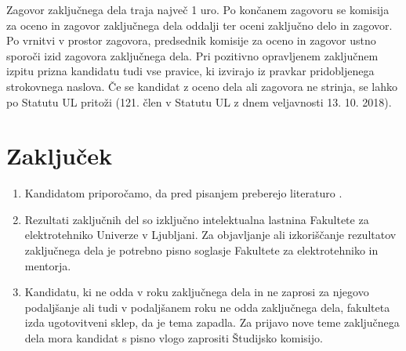 \documentclass[a4paper,twoside,openright,12pt,slovene]{book}
\begin{document}
Zagovor zaključnega dela traja največ 1 uro. Po končanem zagovoru se komisija za oceno in zagovor zaključnega dela oddalji ter oceni zaključno delo in zagovor. Po vrnitvi v prostor zagovora, predsednik komisije za oceno in zagovor ustno sporoči izid zagovora zaključnega dela. Pri pozitivno opravljenem zaključnem izpitu prizna kandidatu tudi vse pravice, ki izvirajo iz pravkar pridobljenega strokovnega naslova. Če se kandidat z oceno dela ali zagovora ne strinja, se lahko po Statutu UL pritoži (121. člen v Statutu UL z dnem veljavnosti 13. 10. 2018).

\chapter{Zaključek} \label{zakljucek}

\begin{enumerate}

\item Kandidatom priporočamo, da pred pisanjem preberejo literaturo \cite{miklavcic2010objavljanje, juznic1992diplomska, kuscer1996}.

\item Rezultati zaključnih del so izključno intelektualna lastnina Fakultete za elektrotehniko Univerze v Ljubljani. Za objavljanje ali izkoriščanje rezultatov zaključnega dela je potrebno pisno soglasje Fakultete za elektrotehniko in mentorja.

\item Kandidatu, ki ne odda v roku zaključnega dela in ne zaprosi za njegovo podaljšanje ali tudi v podaljšanem roku ne odda zaključnega dela, fakulteta izda ugotovitveni sklep, da je tema zapadla. Za prijavo nove teme zaključnega dela mora kandidat s pisno vlogo zaprositi Študijsko komisijo.

\end{enumerate}

\cleardoublepage{} %



\end{document}
